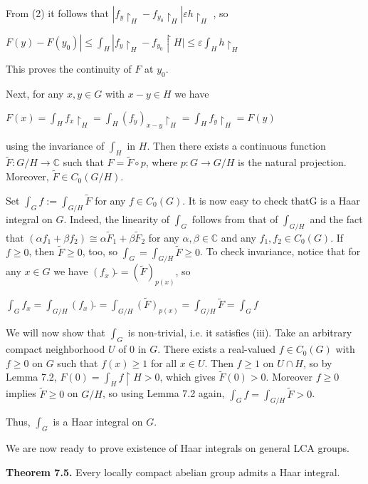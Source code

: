\documentclass[12pt]{article}
\begin{document}
    From (2) it follows that $| f_y \upharpoonright_H - f_{y_0} \upharpoonright_H |  \varepsilon h \upharpoonright_H$ , so


    $F(y) - F(y_0)| \leqslant \int_H | f_y \upharpoonright_H - f_{y_0} \upharpoonright{H} | \leqslant \varepsilon \int_H h \upharpoonright_H $


This proves the continuity of $F$ at $y_0$.


    Next, for any $x, y \in G$ with $x - y \in H$ we have


$F(x) = \int_H f_x \upharpoonright_H = \int_H (f_y)_{x-y} \upharpoonright_H = \int_H f_y \upharpoonright_H = F(y)$


using the invariance of $\int_H$ in $H$. Then there exists a continuous function $\tilde{F} : G/H \to \mathbb{C}$ such that $F = \tilde{F} \circ p$, where
$p : G \to G/H$ is the natural projection. Moreover, $\tilde{F} \in C_0(G/H)$.


    Set $\int_G f := \int_{G/H} \tilde{F}$ for any $f \in C_0(G)$. It is now easy to check thatG is a Haar integral on $G$. Indeed, the linearity of $\int_G$
follows from that of $\int_{G/H}$ and the fact that $(\alpha f_1 + \beta f_2) \cong \alpha \tilde{F}_1 + \beta \tilde{F}_2$ for any $\alpha, \beta \in \mathbb{C}$ and any $f_1, f_2 \in C_0(G)$. If $f \geqslant 0$,
then $\tilde{F} \geqslant 0$, too, so $\int_G = \int_{G/H} \tilde{F} \geqslant 0$. To check invariance, notice that for any $x \in G$ we have $(f_x) \tilde{} = (\tilde{F} )_{p(x)}$, so


$\int_G f_x = \int_{G/H} (f_x) \tilde{} = \int_{G/H} \tilde{(F)}_{p(x)} = \int_{G/H} \tilde{F} = \int_G f$


    We will now show that $\int_G$ is non-trivial, i.e. it satisfies (iii). Take an arbitrary compact neighborhood $U$ of 0 in $G$.
There exists a real-valued $f \in C_0(G)$ with $f \geqslant 0$ on $G$ such that $f (x) \geqslant 1$ for all $x \in U$. Then $f \geqslant 1$ on $U \cap H$, so by
Lemma 7.2, $F (0) = \int_H f \upharpoonright H > 0$, which gives $\tilde{F} (0) > 0$. Moreover $f \geqslant 0$ implies $\tilde{F} \geqslant 0$ on $G/H$, so using Lemma 7.2 again,
$\int_G f = \int_{G/H} \tilde{F} > 0$.


    Thus, $\int_G$ is a Haar integral on $G$. 


    We are now ready to prove existence of Haar integrals on general LCA groups.


\textbf{Theorem 7.5.} Every locally compact abelian group admits a Haar integral.
\end{document}
